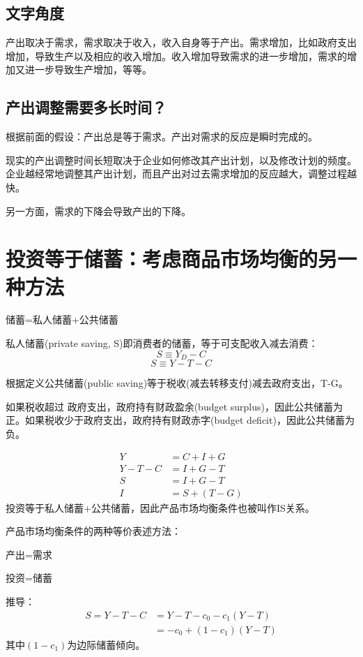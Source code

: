 \documentclass{article}
\begin{document}
\subsection{文字角度}
产出取决于需求，需求取决于收入，收入自身等于产出。需求增加，比如政府支出增加，导致生产以及相应的收入增加。收入增加导致需求的进一步增加，需求的增加又进一步导致生产增加，等等。




\subsection{产出调整需要多长时间？}
根据前面的假设：产出总是等于需求。产出对需求的反应是瞬时完成的。

现实的产出调整时间长短取决于企业如何修改其产出计划，以及修改计划的频度。企业越经常地调整其产出计划，而且产出对过去需求增加的反应越大，调整过程越快。

另一方面，需求的下降会导致产出的下降。

\section{投资等于储蓄：考虑商品市场均衡的另一种方法}
储蓄=私人储蓄+公共储蓄

私人储蓄(private saving, S)即消费者的储蓄，等于可支配收入减去消费：
\[
S\equiv Y_D-C
\]
\[
S\equiv Y-T-C
\]

根据定义公共储蓄(public saving)等于税收(减去转移支付)减去政府支出，T-G。

如果税收超过 政府支出，政府持有财政盈余(budget surplus)，因此公共储蓄为正。如果税收少于政府支出，政府持有财政赤字(budget deficit)，因此公共储蓄为负。

\begin{equation*}
	\begin{split}
	Y&=C+I+G\\
	Y-T-C&=I+G-T\\
	S&=I+G-T\\
	I&=S+(T-G)
	\end{split}
\end{equation*}
投资等于私人储蓄+公共储蓄，因此产品市场均衡条件也被叫作IS关系。

产品市场均衡条件的两种等价表述方法：

产出=需求

投资=储蓄

\hspace*{\fill}

推导：
\begin{equation*}
	\begin{split}
	S=Y-T-C&=Y-T-c_0-c_1(Y-T)\\
	&=-c_0+(1-c_1)(Y-T)
	\end{split}
\end{equation*}
其中$ (1-c_1) $为边际储蓄倾向。
\end{document}
